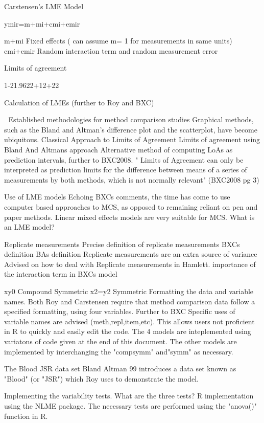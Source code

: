  
Carstensen's LME Model
 
ymir=m+mi+cmi+emir
 
m+mi    Fixed effects ( can assume m= 1 for measurements in same units)
cmi+emir      Random interaction term and random measurement error
 
 
Limits of agreement
 
 
1-21.9622+12+22

 


Calculation of LMEs (further to Roy and BXC)
 
 Established methodologies for method comparison studies
Graphical methods, such as the Bland and Altman's difference plot and the scatterplot, have become ubiquitous.
Classical Approach to Limits of Agreement
Limits of agreement using Bland And Altmans approach
Alternative method of computing LoAs as prediction intervals, further to BXC2008.
" Limits of Agreement can only be interpreted as prediction limits for the difference between means of a series of measurements by both methods, which is not normally relevant" (BXC2008 pg 3)
 
Use of LME models
Echoing BXCs comments, the time has come to use computer based approaches to MCS, as opposed to remaining reliant on pen and paper methods.
Linear mixed effects models are very suitable for MCS.
What is an LME model?
 
Replicate measurements
Precise definition of replicate measurements
BXCs definition
BAs definition
Replicate measurements are an extra source of variance
Advised on how to deal with Replicate measurements in Hamlett. 
importance of the interaction term in BXCs model
 
               xy0
Compound Symmetric     	x2=y2
Symmetric                        
Formatting the data and variable names.
Both Roy and Carstensen require that method comparison data follow a specified formatting, using four variables.
Further to BXC Specific uses of variable names are advised (meth,repl,item,etc).
This allows users not proficient in R to quickly and easily edit the code.
The 4 models are inteplemented using variatons of code given at the end of this document.
The other models are implemented by interchanging the "compsymm" and"symm" as necessary.
 
The Blood JSR data set
Bland Altman 99 introduces a data set known as "Blood" (or "JSR") which Roy uses to demonstrate the model.
 
Implementing the variability tests.
What are the three tests?
R implementation using the NLME package. 
The necessary tests are performed using the "anova()" function in R. 
 
